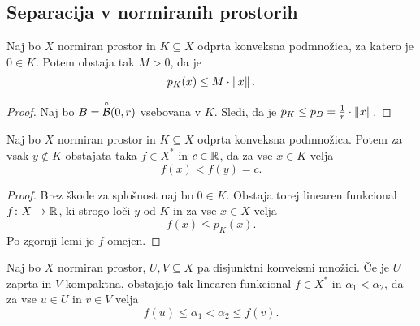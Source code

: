 \newpage

\subsection{Separacija v normiranih prostorih}

\begin{lema}
Naj bo $X$ normiran prostor in $K \subseteq X$ odprta konveksna
podmnožica, za katero je $0 \in K$. Potem obstaja tak $M > 0$, da
je
\[
p_K(x) \leq M \cdot \left\lVert x\right\rVert.
\]
\end{lema}

\begin{proof}
Naj bo $B = \overset{\circ}{\mathcal{B}}(0, r)$ vsebovana v $K$. Sledi, da je
$p_K \leq p_B = \frac{1}{r} \cdot \left\lVert x\right\rVert$.
\end{proof}

\begin{izrek}
Naj bo $X$ normiran prostor in $K \subseteq X$ odprta konveksna
podmnožica. Potem za vsak $y \not \in K$ obstajata taka $f \in X^*$
in $c \in \mathbb{R}$, da za vse $x \in K$ velja
\[
f(x) < f(y) = c.
\]
\end{izrek}

\begin{proof}
Brez škode za splošnost naj bo $0 \in K$. Obstaja torej linearen
funkcional $f \colon X \to \mathbb{R}$, ki strogo loči $y$ od $K$ in za vse
$x \in X$ velja
\[
f(x) \leq p_K(x).
\]
Po zgornji lemi je $f$ omejen.
\end{proof}

\begin{izrek}
Naj bo $X$ normiran prostor, $U, V \subseteq X$ pa disjunktni
konveksni množici. Če je $U$ zaprta in $V$ kompaktna, obstajajo tak
linearen funkcional $f \in X^*$ in $\alpha_1 < \alpha_2$, da za vse
$u \in U$ in $v \in V$ velja
\[
f(u) \leq \alpha_1 < \alpha_2 \leq f(v).
\]
\end{izrek}
